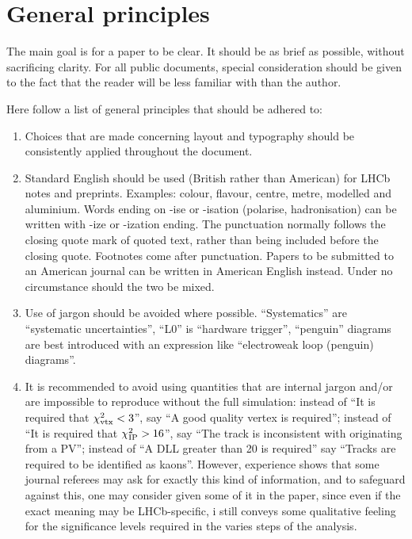 \section{General principles}

The main goal is for a paper to be clear. It should be as brief as
possible, without sacrificing clarity. For all public documents,
special consideration should be given to the fact that the reader will
be less familiar with \lhcb than the author.

Here follow a list of general principles that should be adhered to:
\begin{enumerate}

\item Choices that are made concerning layout and typography
  should be consistently applied throughout the document.

\item Standard English should be used (British rather than American)
  for LHCb notes and preprints. Examples: colour, flavour, centre,
  metre, modelled and aluminium. Words ending on -ise or -isation
  (polarise, hadronisation) can be written with -ize or -ization ending.
  The punctuation normally follows the closing quote mark of quoted text, 
  rather than being included before the closing quote.
  Footnotes come after punctuation. 
  Papers to be submitted to an American journal can be written in American
  English instead. Under no circumstance should the two be mixed.

\item Use of jargon should be avoided where possible. ``Systematics'' are ``systematic
  uncertainties'', ``L0'' is ``hardware trigger'', ``penguin'' diagrams
  are best introduced with an expression like ``electroweak loop (penguin) diagrams''.

\item It is recommended to avoid using quantities that are internal jargon and/or 
  are impossible to reproduce without the full simulation: instead of ``It is 
  required that $\chi^2_{\text{vtx}}<3$'', say ``A good quality vertex is required''; 
  instead of ``It is required that $\chi^2_{\text{IP}}>16$'', say ``The track is 
  inconsistent with originating from a PV''; instead of ``A DLL greater 
  than 20 is required'' say ``Tracks are required to be identified as kaons''.
  However, experience shows that some journal referees may ask for 
  exactly this kind of information, and to safeguard against this,
  one may consider given some of it in the paper, since even if the
  exact meaning may be LHCb-specific, i still conveys some qualitative
  feeling for the significance levels required in the varies steps of
  the analysis.   
 

\end{enumerate}
